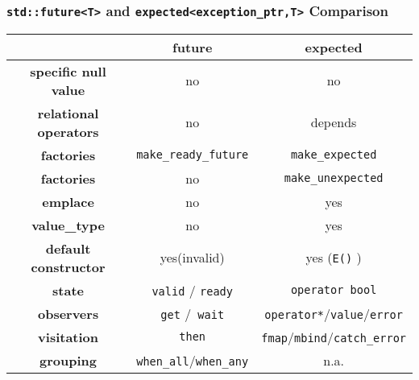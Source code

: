 \documentclass[xcolor=dvipsnames]{beamer}
\newcommand{\cpp}[1]{\lstinline{#1}}
\begin{document}
\begin{frame}[fragile]
\frametitle{\cpp{std::future<T>} and \cpp{expected<exception_ptr,T>} Comparison}

\begin{tabular}{|c|c|c|}
\hline
                    & \textbf{future} & \textbf{expected}  \\
\hline
\textbf{specific null value} & no & no \\
\hline
\textbf{relational operators} & no & depends \\
\hline
\textbf{factories} & \cpp{make_ready_future} & \cpp{make_expected}  \\
\hline
\textbf{factories} & no & \cpp{make_unexpected}  \\
\hline
\textbf{emplace} & no & yes \\
\hline
\textbf{value\_type} & no & yes  \\
\hline
\textbf{default constructor} & yes(invalid) & yes (\cpp{E()} )  \\
\hline
\textbf{state} & \cpp{valid} / \cpp{ready} & \cpp{operator bool}   \\
\hline
\textbf{observers} & \cpp{get} /\cpp{ wait} & \cpp{operator*}/\cpp{value}/\cpp{error}   \\
\hline
\textbf{visitation} & \cpp{then} & \cpp{fmap}/\cpp{mbind}/\cpp{catch_error}  \\
\hline
\textbf{grouping}  &  \cpp{when_all}/\cpp{when_any} &  n.a. \\
\hline
\end{tabular}
\end{frame}
\end{document}
